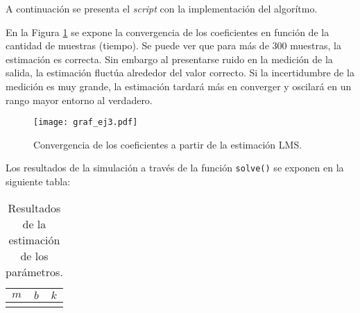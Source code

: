 	
	A continuación se presenta el \emph{script} con la implementación del algorítmo. 
	

	En la Figura \ref{fig:ej3} se expone la convergencia de los coeficientes en función de la cantidad de muestras (tiempo). Se puede ver que para más de 300 muestras, la estimación es correcta. Sin embargo al presentarse ruido en la medición de la salida, la estimación fluctúa alrededor del valor correcto. 
	Si la incertidumbre de la medición es muy grande, la estimación tardará más en converger y oscilará en un rango mayor entorno al verdadero.

	\begin{figure}[h!]
		\centering
		\texttt{[image: graf\_ej3.pdf]}
		\caption{Convergencia de los coeficientes a partir de la estimación LMS.}
		\label{fig:ej3}
	\end{figure}

	
	Los resultados de la simulación a través de la función \texttt{solve()} se exponen en la siguiente tabla: 
		\begin{table}[h!]
			\centering
			\begin{tabular}{ccc}
				\toprule
				$m$	& $b$	& $k$\\
				\midrule
				&&\\
				\bottomrule
			\end{tabular}
			\caption{Resultados de la estimación de los parámetros.}
			\label{tab:res_ej3}
		\end{table}


